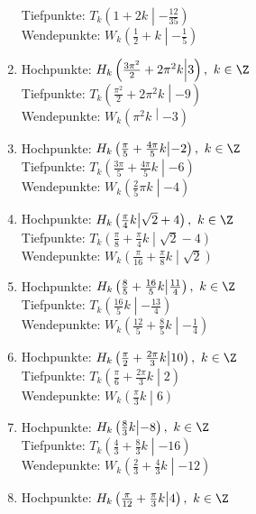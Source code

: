 \begin{Answer}[ref=sincosExtremWendeA1]
\begin{enumerate}[label=\alph*)]
		Tiefpunkte: \(T_k\left(1+2k \middle\vert-\frac{12}{35} \right)\)\\
		Wendepunkte: \(W_k\left(\frac{1}{2}+k \middle\vert-\frac{1}{5} \right)\)
		\item Hochpunkte: \(H_k\left(\frac{3\pi^2}{2}+2\pi^2 k \middle\vert3 \right),\ k\in\Z\)\\
		Tiefpunkte: \(T_k\left(\frac{\pi^2}{2}+2\pi^2 k \middle\vert-9 \right)\)\\
		Wendepunkte: \(W_k\left(\pi^2 k \middle\vert-3 \right)\)
		\item Hochpunkte: \(H_k\left(\frac{\pi}{5}+\frac{4\pi}{5}k \middle\vert-2 \right),\ k\in\Z\)\\
		Tiefpunkte: \(T_k\left(\frac{3\pi}{5}+\frac{4\pi}{5}k \middle\vert-6 \right)\)\\
		Wendepunkte: \(W_k\left(\frac{2}{5}\pi k \middle\vert-4 \right)\)
		\item Hochpunkte: \(H_k\left(\frac{\pi}{4}k \middle\vert\sqrt{2}+4 \right),\ k\in\Z\)\\
		Tiefpunkte: \(T_k\left(\frac{\pi}{8}+\frac{\pi}{4}k \middle\vert\sqrt{2}-4 \right)\)\\
		Wendepunkte: \(W_k\left(\frac{\pi}{16}+\frac{\pi}{8}k \middle\vert\sqrt{2} \right)\)
		\item Hochpunkte: \(H_k\left(\frac{8}{5}+\frac{16}{5}k \middle\vert\frac{11}{4} \right),\ k\in\Z\)\\
		Tiefpunkte: \(T_k\left(\frac{16}{5}k \middle\vert-\frac{13}{4} \right)\)\\
		Wendepunkte: \(W_k\left(\frac{12}{5}+\frac{8}{5}k \middle\vert -\frac{1}{4}\right)\)
		\item Hochpunkte: \(H_k\left(\frac{\pi}{2}+\frac{2\pi}{3}k \middle\vert10 \right),\ k\in\Z\)\\
		Tiefpunkte: \(T_k\left(\frac{\pi}{6}+\frac{2\pi}{3}k \middle\vert2 \right)\)\\
		Wendepunkte: \(W_k\left(\frac{\pi}{3}k \middle\vert6 \right)\)
		\item Hochpunkte: \(H_k\left(\frac{8}{3}k \middle\vert-8 \right),\ k\in\Z\)\\
		Tiefpunkte: \(T_k\left(\frac{4}{3}+\frac{8}{3}k \middle\vert-16 \right)\)\\
		Wendepunkte: \(W_k\left(\frac{2}{3}+\frac{4}{3}k \middle\vert-12 \right)\)
		\item Hochpunkte: \(H_k\left(\frac{\pi}{12}+\frac{\pi}{3}k \middle\vert4 \right),\ k\in\Z\)\\

\end{enumerate}
\end{Answer}
